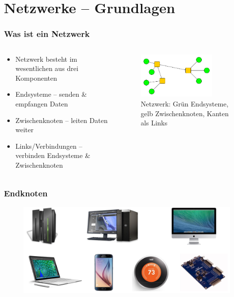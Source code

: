 \documentclass[xcolor=dvipsnames, aspectratio=169]{beamer}
\begin{document}
\section{Netzwerke -- Grundlagen}
\begin{frame}
	\frametitle{Was ist ein Netzwerk}
	\begin{columns}
		\begin{column}{0.5\textwidth}
   			\begin{itemize}
   				\item Netzwerk besteht im wesentlichen aus drei Komponenten
   				\item Endsysteme -- senden \& empfangen Daten
   				\item Zwischenknoten -- leiten Daten weiter
   				\item Links/Verbindungen -- verbinden Endsysteme \& Zwischenknoten
   			\end{itemize}
		\end{column}
	\begin{column}{0.5\textwidth}  %
	\begin{figure}
    \begin{center}
     \includegraphics[width=0.8\textwidth]{network}
     \caption{Netzwerk: Grün Endsysteme, gelb Zwischenknoten, Kanten als Links}
     \end{center}
     \end{figure}
\end{column}
\end{columns}
\end{frame}

\begin{frame}
	\frametitle{Endknoten}
	\begin{figure}
		\includegraphics[scale=0.15]{endknoten}
	\end{figure}
\end{frame}
\end{document}
